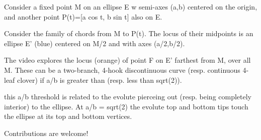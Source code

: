 Consider a fixed point M on an ellipse E w semi-axes (a,b) centered on the origin, and another point P(t)=[a cos t, b sin t] also on E.

Consider the family of chords from M to P(t). The locus of their midpoints is an ellipse E' (blue) centered on M/2 and with axes (a/2,b/2).

The video explores the locus (orange) of point F on E' farthest from M, over all M. These can be a two-branch, 4-hook discontinuous curve (resp. continuous 4-leaf clover) if a/b is greater than (resp. less than sqrt(2)).

this a/b threshold is related to the evolute pierceing out (resp. being completely interior) to the ellipse. At a/b = sqrt(2) the evolute top and bottom tips touch the ellipse at its top and bottom vertices. 

Contributions are welcome!